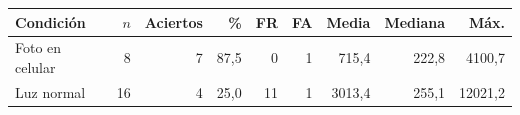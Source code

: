 \begin{tabular}{P{2.7cm}rrrrrrrr}\toprule Condición & $n$ & Aciertos & \% & FR & FA & Media & Mediana & Máx. \\ \midrule
Foto en celular & 8 & 7 & 87,5 & 0 & 1 & 715,4 & 222,8 & 4100,7 \\
Luz normal & 16 & 4 & 25,0 & 11 & 1 & 3013,4 & 255,1 & 12021,2 \\
\bottomrule\end{tabular}